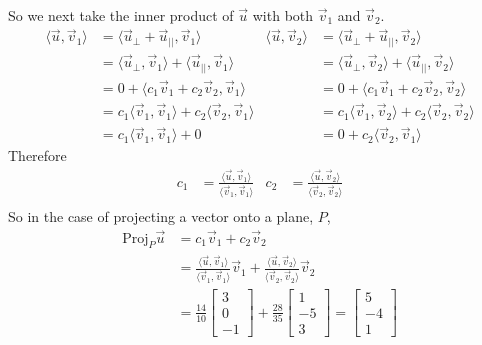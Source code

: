 \begin{example}
\begin{align*}
\end{align*}
So we next take the inner product of $\vec{u}$ with both $\vec{v}_1$ and $\vec{v}_2$. 
\begin{align*}
\langle \vec{u}, \vec{v}_1 \rangle & = \langle \vec{u}_{\perp} + \vec{u}_{||}, \vec{v}_1 \rangle &
\langle \vec{u}, \vec{v}_2 \rangle & = \langle \vec{u}_{\perp} + \vec{u}_{||}, \vec{v}_2 \rangle \\
& = \langle \vec{u}_{\perp}, \vec{v}_1 \rangle + \langle \vec{u}_{||}, \vec{v}_1 \rangle &
& = \langle \vec{u}_{\perp}, \vec{v}_2 \rangle + \langle \vec{u}_{||}, \vec{v}_2 \rangle \\
& = 0 + \langle c_1 \vec{v}_1 + c_2 \vec{v}_2 ,\vec{v}_1 \rangle &
& = 0 + \langle c_1 \vec{v}_1 + c_2 \vec{v}_2 ,\vec{v}_2 \rangle \\
& = c_1 \langle \vec{v}_1, \vec{v}_1 \rangle + c_2 \langle \vec{v}_2, \vec{v}_1 \rangle &
& = c_1 \langle \vec{v}_1, \vec{v}_2 \rangle + c_2 \langle \vec{v}_2, \vec{v}_2 \rangle \\
& = c_1 \langle \vec{v}_1, \vec{v}_1 \rangle + 0 &
& = 0 + c_2 \langle \vec{v}_2, \vec{v}_1 \rangle 
\end{align*}
Therefore
\begin{align*}
c_1 & = \frac{\langle \vec{u},\vec{v}_1 \rangle}{\langle \vec{v}_1, \vec{v}_1 \rangle} &
c_2 & = \frac{\langle \vec{u},\vec{v}_2 \rangle}{\langle \vec{v}_2, \vec{v}_2 \rangle} \\
\end{align*}
So in the case of projecting a vector onto a plane, $P$,
\begin{align*}
\text{Proj}_{P} \vec{u} & = c_1 \vec{v}_1 + c_2 \vec{v}_2 \\
& = \frac{\langle \vec{u},\vec{v}_1 \rangle}{\langle \vec{v}_1, \vec{v}_1 \rangle} \vec{v}_1 +
\frac{\langle \vec{u},\vec{v}_2 \rangle}{\langle \vec{v}_2, \vec{v}_2 \rangle} \vec{v}_2 \\
& = \frac{14}{10} \begin{bmatrix}
3 \\ 0 \\ -1 
\end{bmatrix} + \frac{28}{35} \begin{bmatrix}
1 \\ -5 \\ 3
\end{bmatrix} = \begin{bmatrix}
5 \\-4 \\ 1
\end{bmatrix}
\end{align*} 
\end{example}






